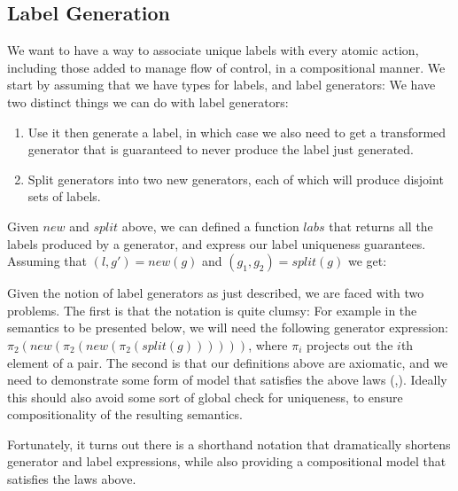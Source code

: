 \subsection{Label Generation}

We want to have a way to associate unique labels
with every atomic action, including those added to manage flow of control,
in a compositional manner.
We start by assuming that we have types for labels,
and label generators:
We have two distinct things we can do with label generators:
\begin{enumerate}
  \item
   Use it then generate a label,
   in which case we also need to get a transformed generator
   that is guaranteed to never produce the label just generated.
  \item
   Split generators into two new generators,
   each of which will produce disjoint sets of labels.
\end{enumerate}
Given $new$ and $split$ above, we can defined a function $labs$ that
returns all the labels produced by a generator,
and express our label uniqueness guarantees.
Assuming that $ (l,g') = new(g)$ and $(g_1,g_2) = split(g)$
we get:

Given the notion of label generators as just described,
we are faced with two problems.
The first is that the notation is quite clumsy:
For example in the semantics to be presented below,
we will need the following generator expression:
$
\pi_2(new(\pi_2(new(\pi_2(split(g))))))
$,
where $\pi_i$ projects out the $i$th element of a pair.
The second is that our definitions above are axiomatic,
and we need to demonstrate some form of model that satisfies
the above laws (,).
Ideally this should also avoid some sort of global check for uniqueness,
to ensure compositionality of the resulting semantics.

Fortunately,
it turns out there is a shorthand notation that dramatically shortens
generator and label expressions,
while also providing a compositional model that satisfies the laws above.

